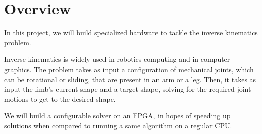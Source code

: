 \section{Overview}

In this project, we will build specialized hardware to tackle the inverse kinematics problem.

Inverse kinematics is widely used in robotics computing and in computer graphics. The problem takes as input a configuration of mechanical joints, which can be rotational or sliding, that are present in an arm or a leg. Then, it takes as input the limb's current shape and a target shape, solving for the required joint motions to get to the desired shape.

We will build a configurable solver on an FPGA, in hopes of speeding up solutions when compared to running a same algorithm on a regular CPU.